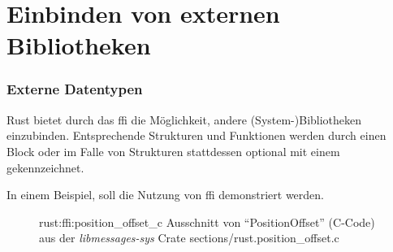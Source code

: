 \section{Einbinden von externen Bibliotheken}

\subsubsection{Externe Datentypen}
\label{rust:ffi}
\label{rust:ffi:datatypes}

Rust bietet durch das \gls{ffi} die Möglichkeit, andere (System-)Bibliotheken einzubinden.
Entsprechende Strukturen und Funktionen werden durch einen  Block
oder im Falle von Strukturen stattdessen optional mit einem \rustcinline{#[repr(C)]} gekennzeichnet.

In einem Beispiel, soll die Nutzung von \gls{ffi} demonstriert werden.

\begin{figure}[H]
	\ccinclude
		{rust:ffi:position_offset_c}
		{Ausschnitt von \enquote{PositionOffset} (C-Code) aus der \textit{libmessages-sys} Crate}
		{sections/rust.position_offset.c}
	
\end{figure}

